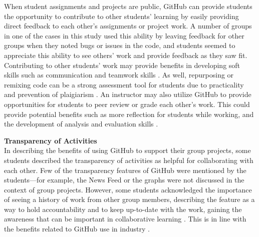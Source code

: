 When student assignments and projects are public, GitHub can provide students the opportunity to contribute to other students' learning by easily providing direct feedback to each other's assignments or project work. A number of groups in one of the cases in this study used this ability by leaving feedback for other groups when they noted bugs or issues in the code, and students seemed to appreciate this ability to see others' work and provide feedback as they saw fit. Contributing to other students' work may provide benefits in developing soft skills such as communication and teamwork skills \cite{hamer2006some}. As well, repurposing or remixing code can be a strong assessment tool for students due to practicality and prevention of plaigiarism \cite{sant2015code}. An instructor may also utilize GitHub to provide opportunities for students to peer review or grade each other's work. This could provide potential benefits such as more reflection for students while working, and the development of analysis and evaluation skills \cite{sondergaard2012collaborative}.


\textbf{Transparency of Activities} \\
In describing the benefits of using GitHub to support their group projects, some students described the transparency of activities as helpful for collaborating with each other. Few of the transparency features of GitHub were mentioned by the students---for example, the News Feed or the graphs were not discussed in the context of group projects. However, some students acknowledged the importance of seeing a history of work from other group members, describing the feature as a way to hold accountability and to keep up-to-date with the work, gaining the awareness that can be important in collaborative learning \cite{janssen2013coordinated}. This is in line with the benefits related to GitHub use in industry \cite{dabbish2012social}.

